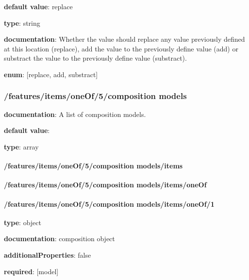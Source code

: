 \begin{itemized}
\item {\bf default value}: replace
\item {\bf type}: string
\item {\bf documentation}: Whether the value should replace any value previously defined at this location (replace), add the value to the previously define value (add) or substract the value to the previously define value (substract).
\item {\bf enum}: [replace, add, substract]\end{itemized}\subsubsection{/features/items/oneOf/5/composition models} \begin{itemized}
\item {\bf documentation}: A list of composition models.
\item {\bf default value}: 
\item {\bf type}: array
\paragraph{/features/items/oneOf/5/composition models/items} \begin{itemized}
\end{itemized}\end{itemized}\paragraph{/features/items/oneOf/5/composition models/items/oneOf} \begin{itemized}
\end{itemized}\paragraph{/features/items/oneOf/5/composition models/items/oneOf/1} \begin{itemized}
\item {\bf type}: object
\item {\bf documentation}: composition object
\item {\bf additionalProperties}: false
\item {\bf required}: [model]\end{itemized}
